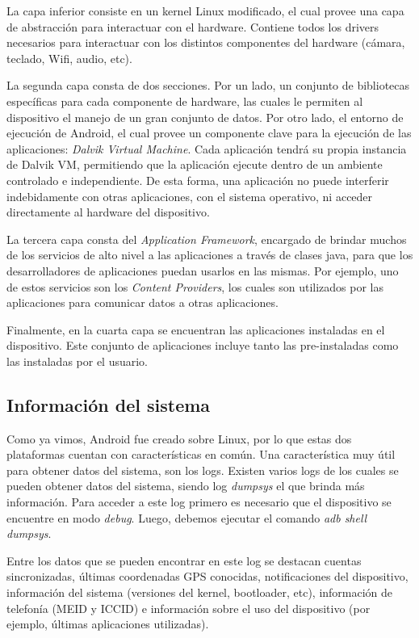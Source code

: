 La capa inferior consiste en un kernel Linux modificado, el cual provee una capa de abstracción para interactuar con el hardware. Contiene todos los drivers necesarios para interactuar con los distintos componentes del hardware (cámara, teclado, Wifi, audio, etc).

La segunda capa consta de dos secciones. Por un lado, un conjunto de bibliotecas específicas para cada componente de hardware, las cuales le permiten al dispositivo el manejo de un gran conjunto de datos. Por otro lado, el entorno de ejecución de Android, el cual provee un componente clave para la ejecución de las aplicaciones: \emph{Dalvik Virtual Machine}. Cada aplicación tendrá su propia instancia de Dalvik VM, permitiendo que la aplicación ejecute dentro de un ambiente controlado e independiente. De esta forma, una aplicación no puede interferir indebidamente con otras aplicaciones, con el sistema operativo, ni acceder directamente al hardware del dispositivo.

La tercera capa consta del \emph{Application Framework}, encargado de brindar muchos de los servicios de alto nivel a las aplicaciones a través de clases java, para que los desarrolladores de aplicaciones puedan usarlos en las mismas. Por ejemplo, uno de estos servicios son los \emph{Content Providers}, los cuales son utilizados por las aplicaciones para comunicar datos a otras aplicaciones.

Finalmente, en la cuarta capa se encuentran las aplicaciones instaladas en el dispositivo. Este conjunto de aplicaciones incluye tanto las pre-instaladas como las instaladas por el usuario.

\subsection{Información del sistema}
Como ya vimos, Android fue creado sobre Linux, por lo que estas dos plataformas cuentan con características en común. Una característica muy útil para obtener datos del sistema, son los logs. Existen varios logs de los cuales se pueden obtener datos del sistema, siendo log \emph{dumpsys} el que brinda más información. Para acceder a este log primero es necesario que el dispositivo se encuentre en modo \emph{debug}. Luego, debemos ejecutar el comando \textit{adb shell dumpsys}.

Entre los datos que se pueden encontrar en este log se destacan cuentas sincronizadas, últimas coordenadas GPS conocidas, notificaciones del dispositivo, información del sistema (versiones del kernel, bootloader, etc), información de telefonía (MEID y ICCID) e información sobre el uso del dispositivo (por ejemplo, últimas aplicaciones utilizadas).

